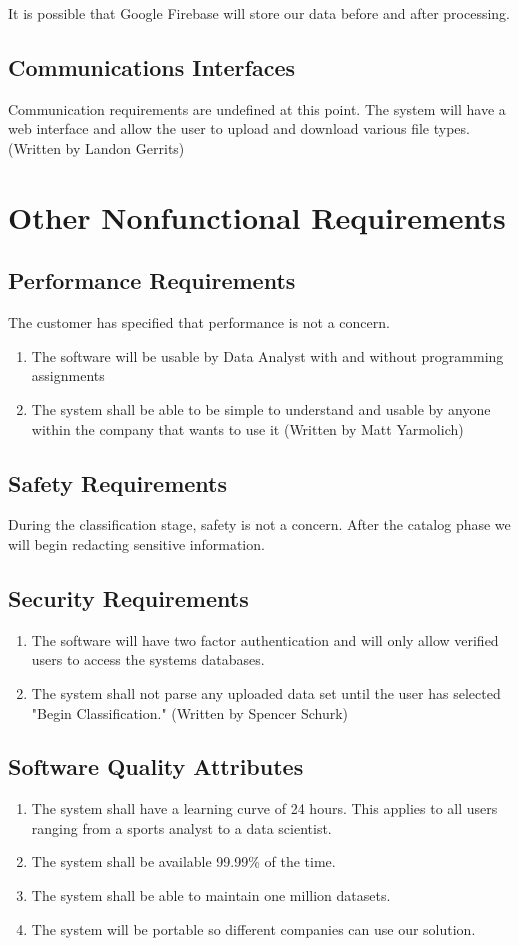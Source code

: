 \documentclass[12pt,oneside,letterpaper]{article}
\begin{document}
It is possible that Google \gls{Firebase} will store our data before and after processing.
\subsection{Communications Interfaces}
Communication requirements are undefined at this point. The system will have a web interface and allow the user to upload and download various file types. (Written by Landon Gerrits)

\section{Other Nonfunctional Requirements}
\subsection{Performance Requirements}
The customer has specified that performance is not a concern.
\begin{enumerate}
    \item The software will be usable by Data Analyst with and without programming assignments
    \item The system shall be able to be simple to understand and usable by anyone within the company that wants to use it (Written by Matt Yarmolich)
\end{enumerate}
\subsection{Safety Requirements}
During the classification stage, safety is not a concern. After the catalog phase we will begin redacting sensitive information.
\subsection{Security Requirements}
\begin{enumerate}
    \item The software will have two factor authentication and will only allow verified users to access the systems databases.
    \item The system shall not parse any uploaded data set until the user has selected "Begin Classification." (Written by Spencer Schurk)
\end{enumerate}
\subsection{Software Quality Attributes}
\begin{enumerate}
    \item The system shall have a learning curve of 24 hours. This applies to all users ranging from a sports analyst to a data scientist.
    \item The system shall be available 99.99\% of the time.
    \item The system shall be able to maintain one million datasets.
    \item The system will be portable so different companies can use our solution.
\end{enumerate}
\end{document}
